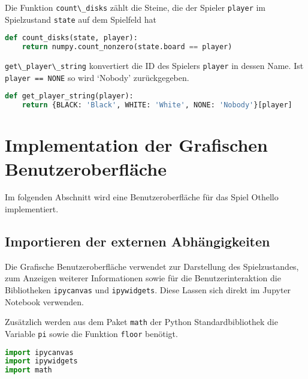Die Funktion \passthrough{\lstinline!count\_disks!} zählt die Steine,
die der Spieler \passthrough{\lstinline!player!} im Spielzustand
\passthrough{\lstinline!state!} auf dem Spielfeld hat

\begin{lstlisting}[language=Python]
def count_disks(state, player):
    return numpy.count_nonzero(state.board == player)
\end{lstlisting}

\passthrough{\lstinline!get\_player\_string!} konvertiert die ID des
Spielers \passthrough{\lstinline!player!} in dessen Name. Ist
\passthrough{\lstinline!player == NONE!} so wird `Nobody' zurückgegeben.

\begin{lstlisting}[language=Python]
def get_player_string(player):
    return {BLACK: 'Black', WHITE: 'White', NONE: 'Nobody'}[player]
\end{lstlisting}

\hypertarget{implementation-der-grafischen-benutzeroberfluxe4che}{%
\section{Implementation der Grafischen
Benutzeroberfläche}\label{implementation-der-grafischen-benutzeroberfluxe4che}}

Im folgenden Abschnitt wird eine Benutzeroberfläche für das Spiel
Othello implementiert.

\hypertarget{importieren-der-externen-abhuxe4ngigkeiten-1}{%
\subsection{Importieren der externen
Abhängigkeiten}\label{importieren-der-externen-abhuxe4ngigkeiten-1}}

Die Grafische Benutzeroberfläche verwendet zur Darstellung des
Spielzustandes, zum Anzeigen weiterer Informationen sowie für die
Benutzerinteraktion die Bibliotheken \passthrough{\lstinline!ipycanvas!}
und \passthrough{\lstinline!ipywidgets!}. Diese Lassen sich direkt im
Jupyter Notebook verwenden.

Zusätzlich werden aus dem Paket \passthrough{\lstinline!math!} der
Python Standardbibliothek die Variable \passthrough{\lstinline!pi!}
sowie die Funktion \passthrough{\lstinline!floor!} benötigt.

\begin{lstlisting}[language=Python]
import ipycanvas
import ipywidgets
import math
\end{lstlisting}

